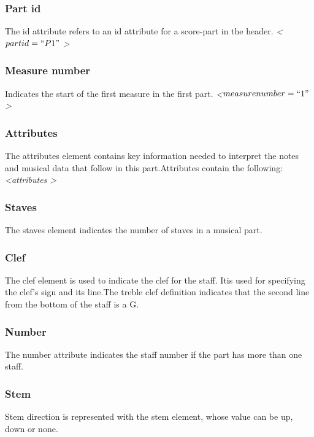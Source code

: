 \documentclass[journal]{IEEEtran}
\begin{document}
\subsubsection{ Part id}
The id attribute refers to an id attribute for a score-part in the header. \newline
\textit{ \textless $part id=``P1" $ \textgreater } 

\subsubsection{ Measure number}
Indicates the start of the first measure in the first part.\newline
\textit{ \textless $measure number=``1" $ \textgreater } 

\subsubsection{Attributes}
The attributes element contains key information needed to interpret the notes and musical data
that follow in this part.Attributes contain the following:
\textit{ \textless  attributes \textgreater } 

\subsubsection{ Staves}
The staves element indicates the number of staves in a musical part.

\subsubsection{Clef}
The clef element is used to indicate the clef for the staff. Itis used for specifying the clef’s sign
and its line.The treble clef definition indicates that the second line from the bottom of the staff is a G.

\subsubsection{Number}
The number attribute indicates the staff number if the part has more than one staff.

\subsubsection{Stem}
Stem direction is represented with the stem element, whose value can be up, down or none.
\end{document}
